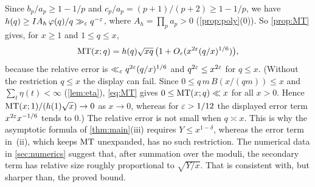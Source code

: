 \begin{remark}
Since $b_p/a_p\ge1-1/p$ and $c_p/a_p=(p+1)/(p+2)\ge1-1/p$, we have $h(q)\ge IA_h\,\varphi(q)/q\gg_\varepsilon q^{-\varepsilon}$, where $A_h=\prod_pa_p>0$ (\cref{prop:poly}(0)). So \cref{prop:MT} gives, for $x\ge1$ and $1\le q\le x$,
\[
\mathrm{MT}(x;q)=h(q)\sqrt{xq}\,\bigl(1+O_\varepsilon(x^{2\varepsilon}(q/x)^{1/6})\bigr),
\]
because the relative error is $\ll_\varepsilon q^{2\varepsilon}(q/x)^{1/6}$ and $q^{2\varepsilon}\le x^{2\varepsilon}$ for $q\le x$. (Without the restriction $q\le x$ the display can fail. Since $0\le q\,m\,B(x/(qm))\le x$ and $\sum_t\eta(t)<\infty$ (\cref{lem:eta}), \eqref{eq:MT} gives $0\le\mathrm{MT}(x;q)\ll x$ for all $x>0$. Hence $\mathrm{MT}(x;1)/(h(1)\sqrt x)\to0$ as $x\to0$, whereas for $\varepsilon>1/12$ the displayed error term $x^{2\varepsilon}x^{-1/6}$ tends to $0$.) The relative error is not small when $q\asymp x$. This is why the asymptotic formula of \cref{thm:main}(iii) requires $Y\le x^{1-\delta}$, whereas the error term in~(ii), which keeps $\mathrm{MT}$ unexpanded, has no such restriction. The numerical data in \cref{sec:numerics} suggest that, after summation over the moduli, the secondary term has relative size roughly proportional to $\sqrt{Y/x}$. That is consistent with, but sharper than, the proved bound.
\end{remark}
